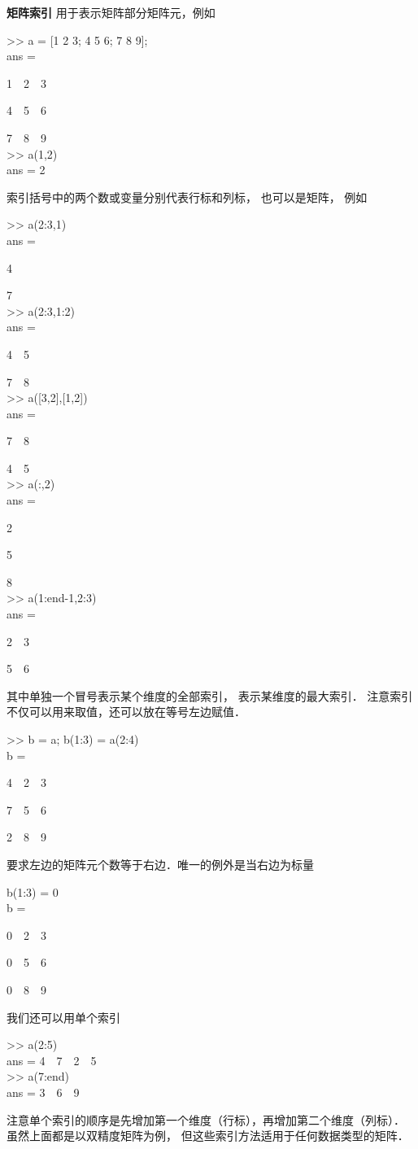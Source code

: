 \textbf{矩阵索引} 用于表示矩阵部分矩阵元，例如
\begin{Command}
>> a = [1 2 3; 4 5 6; 7 8 9]; \\
ans = \par
1\ \ 2\ \ 3 \par
4\ \ 5\ \ 6 \par
7\ \ 8\ \ 9 \\
>> a(1,2) \\
ans = 2
\end{Command}
索引括号中的两个数或变量分别代表行标和列标， 也可以是矩阵， 例如
\begin{Command}
>> a(2:3,1) \\
ans = \par
4 \par
7 \\
>> a(2:3,1:2) \\
ans = \par
4\ \ 5 \par
7\ \ 8 \\
>> a([3,2],[1,2]) \\
ans = \par
7\ \ 8 \par
4\ \ 5 \\
>> a(:,2) \\
ans = \par
2 \par
5 \par
8 \\
>> a(1:end-1,2:3) \\
ans = \par
2\ \ 3 \par
5\ \ 6
\end{Command}
其中单独一个冒号表示某个维度的全部索引，  表示某维度的最大索引． 注意索引不仅可以用来取值，还可以放在等号左边赋值．
\begin{Command}
>> b = a; b(1:3) = a(2:4) \\
b = \par
4\ \ 2\ \ 3 \par
7\ \ 5\ \ 6 \par
2\ \ 8\ \ 9
\end{Command}
要求左边的矩阵元个数等于右边．唯一的例外是当右边为标量
\begin{Command}
b(1:3) = 0 \\
b = \par
0\ \ 2\ \ 3 \par
0\ \ 5\ \ 6 \par
0\ \ 8\ \ 9 
\end{Command}
我们还可以用单个索引
\begin{Command}
>> a(2:5)\\
ans = 4\ \ 7\ \ 2\ \ 5 \\
>> a(7:end)\\
ans = 3\ \ 6\ \ 9
\end{Command}
注意单个索引的顺序是先增加第一个维度（行标），再增加第二个维度（列标）． 虽然上面都是以双精度矩阵为例， 但这些索引方法适用于任何数据类型的矩阵．

